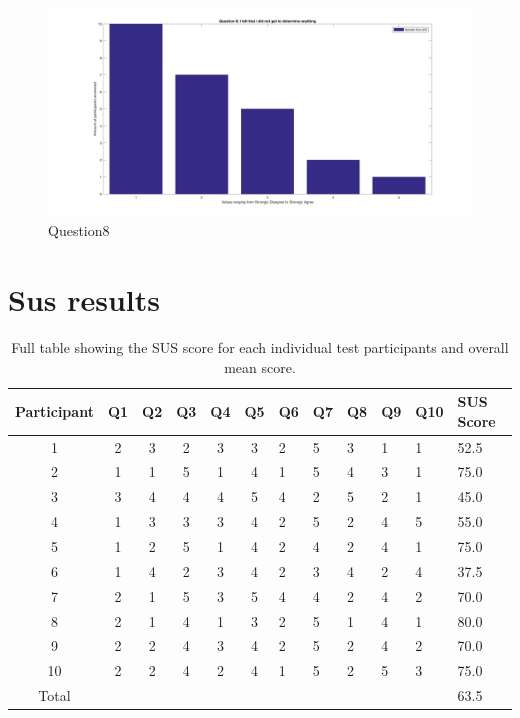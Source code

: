     \begin{figure}[H]
		\centering
		\includegraphics[width=0.9\linewidth]{figure/Appendices/Question8} 
		\caption{Question8}
	\end{figure}

\section{Sus results}\label{appendix:susResults}
\begin{table}[]
	\centering
	\caption{Full table showing the SUS score for each individual test participants and overall mean score.}
	\label{tab:susScoreTableAppendix}
	\begin{tabular}{|c|c|c|c|c|c|l|l|l|l|l|l|}
		\hline
		Participant & Q1 & Q2 & Q3 & Q4 & Q5 & Q6 & Q7 & Q8 & Q9 & Q10 & SUS Score \\ \hline
		1           & 2  & 3  & 2  & 3  & 3  & 2  & 5  & 3  & 1  & 1   & 52.5      \\ \hline
		2           & 1  & 1  & 5  & 1  & 4  & 1  & 5  & 4  & 3  & 1   & 75.0      \\ \hline
		3           & 3  & 4  & 4  & 4  & 5  & 4  & 2  & 5  & 2  & 1   & 45.0      \\ \hline
		4           & 1  & 3  & 3  & 3  & 4  & 2  & 5  & 2  & 4  & 5   & 55.0      \\ \hline
		5           & 1  & 2  & 5  & 1  & 4  & 2  & 4  & 2  & 4  & 1   & 75.0      \\ \hline
		6           & 1  & 4  & 2  & 3  & 4  & 2  & 3  & 4  & 2  & 4   & 37.5      \\ \hline
		7           & 2  & 1  & 5  & 3  & 5  & 4  & 4  & 2  & 4  & 2   & 70.0      \\ \hline
		8           & 2  & 1  & 4  & 1  & 3  & 2  & 5  & 1  & 4  & 1   & 80.0      \\ \hline
		9           & 2  & 2  & 4  & 3  & 4  & 2  & 5  & 2  & 4  & 2   & 70.0      \\ \hline
		10          & 2  & 2  & 4  & 2  & 4  & 1  & 5  & 2  & 5  & 3   & 75.0      \\ \hline
		Total       &    &    &    &    &    &    &    &    &    &     & 63.5      \\ \hline
	\end{tabular}
\end{table}